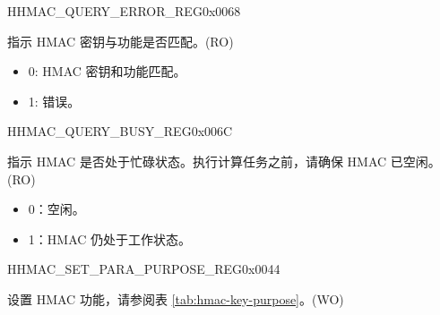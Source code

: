 \begin{register}{H}{HMAC\_QUERY\_ERROR\_REG}{0x0068}\label{regdesc:HMACQUERYERRORREG}
%
%
\regnewline%
\begin{regdesc}\begin{reglist}
\label{fielddesc:HMACQUREYCHECK}\item [HMAC\_QUREY\_CHECK] 指示 HMAC 密钥与功能是否匹配。(RO)
\begin{itemize}
    \item 0: HMAC 密钥和功能匹配。
    \item 1: 错误。
\end{itemize}
\end{reglist}\end{regdesc}
\end{register}


\begin{register}{H}{HMAC\_QUERY\_BUSY\_REG}{0x006C}\label{regdesc:HMACQUERYBUSYREG}
%
%
\regnewline%
\begin{regdesc}\begin{reglist}
\label{fielddesc:HMACBUSYSTATE}\item [HMAC\_BUSY\_STATE] 指示 HMAC 是否处于忙碌状态。执行计算任务之前，请确保 HMAC 已空闲。(RO)
\begin{itemize}
    \item 0：空闲。
    \item 1：HMAC 仍处于工作状态。
\end{itemize}
\end{reglist}\end{regdesc}
\end{register}


\begin{register}{H}{HMAC\_SET\_PARA\_PURPOSE\_REG}{0x0044}\label{regdesc:HMACSETPARAPURPOSEREG}
%
%
\regnewline%
\begin{regdesc}\begin{reglist}
\label{fielddesc:HMACPURPOSESET}\item [HMAC\_PURPOSE\_SET] 设置 HMAC 功能，请参阅表 \ref{tab:hmac-key-purpose}。(WO)
\end{reglist}\end{regdesc}
\end{register}


